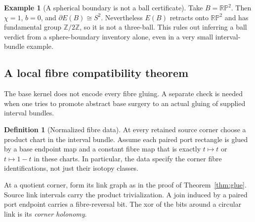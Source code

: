 \documentclass[11pt]{article}
\theoremstyle{definition}
\newtheorem{definition}[theorem]{Definition}
\newtheorem{example}[theorem]{Example}
\theoremstyle{remark}\newtheorem{remark}[theorem]{Remark}
\begin{document}
\begin{example}[A spherical boundary is not a ball certificate]\label{ex:rp2}
Take $B=\mathbb{RP}^2$. Then $\chi=1$, $b=0$, and $\partial E(B)\cong S^2$. Nevertheless $E(B)$ retracts onto $\mathbb{RP}^2$ and has fundamental group $\mathbb Z/2\mathbb Z$, so it is not a three-ball. This rules out inferring a ball verdict from a sphere-boundary inventory alone, even in a very small interval-bundle example.
\end{example}

\subsection{A local fibre compatibility theorem}
The base kernel does not encode every fibre gluing. A separate check is needed when one tries to promote abstract base surgery to an actual gluing of supplied interval bundles.

\begin{definition}[Normalized fibre data]
At every retained source corner choose a product chart in the interval bundle. Assume each paired port rectangle is glued by a base endpoint map and a constant fibre map that is exactly $t\mapsto t$ or $t\mapsto1-t$ in these charts. In particular, the data specify the corner fibre identifications, not just their isotopy classes.
\end{definition}

At a quotient corner, form its link graph as in the proof of Theorem~\ref{thm:glue}. Source link intervals carry the product trivialization. A join induced by a paired port endpoint carries a fibre-reversal bit. The xor of the bits around a circular link is its \emph{corner holonomy}.
\end{document}
